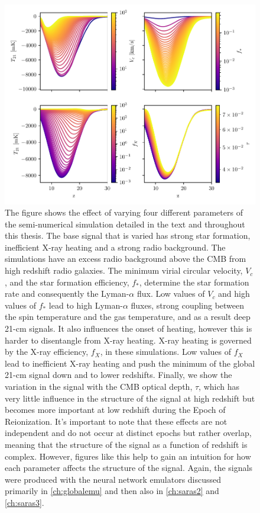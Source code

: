 \begin{figure}
    \centering
    \includegraphics{introduction/figs/other_params_variation.pdf}
    \caption{The figure shows the effect of varying four different parameters of the semi-numerical simulation detailed in the text and throughout this thesis. The base signal that is varied has strong star formation, inefficient X-ray heating and a strong radio background. The simulations have an excess radio background above the CMB from high redshift radio galaxies. The minimum virial circular velocity, $V_c$, and the star formation efficiency, $f_*$, determine the star formation rate and consequently the Lyman-$\alpha$ flux. Low values of $V_c$ and high values of $f_*$ lead to high Lyman-$\alpha$ fluxes, strong coupling between the spin temperature and the gas temperature, and as a result deep 21-cm signals. It also influences the onset of heating, however this is harder to disentangle from X-ray heating. X-ray heating is governed by the X-ray efficiency, $f_X$, in these simulations. Low values of $f_X$ lead to inefficient X-ray heating and push the minimum of the global 21-cm signal down and to lower redshifts. Finally, we show the variation in the signal with the CMB optical depth, $\tau$, which has very little influence in the structure of the signal at high redshift but becomes more important at low redshift during the Epoch of Reionization. It's important to note that these effects are not independent and do not occur at distinct epochs but rather overlap, meaning that the structure of the signal as a function of redshift is complex. However, figures like this help to gain an intuition for how each parameter affects the structure of the signal. Again, the signals were produced with the neural network emulators discussed primarily in \cref{ch:globalemu} and then also in \cref{ch:saras2} and \cref{ch:saras3}.}
    \label{fig:standard_parameters}
\end{figure}

